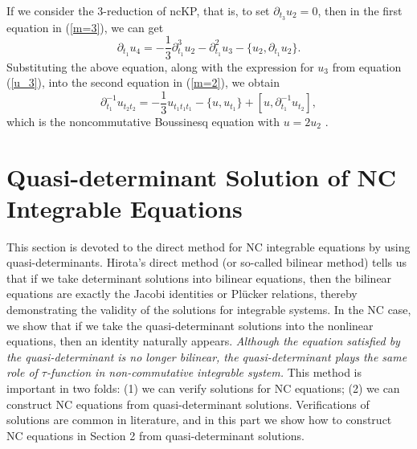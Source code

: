 \documentclass[11p,reqno]{amsart}
\numberwithin{equation}{section}
\numberwithin{equation}{section}
\begin{document}
If we consider the $3$-reduction of ncKP, that is, to set $\partial_{t_3}u_2=0$, then in the first equation in (\ref{m=3}), we can get 
\begin{equation}
    \partial_{t_1} u_4 = - \frac{1}{3} \partial_{t_1}^3 u_2 - \partial_{t_1}^2 u_3 - \{u_2, \partial_{t_1} u_2\}.
\end{equation}
Substituting the above equation, along with the expression for $u_3$ from equation (\ref{u_3}), into the second equation in (\ref{m=2}), we obtain
\begin{equation} \label{ncBoussinesq}
    \partial_{t_1}^{-1} u_{t_2t_2} = - \frac{1}{3} u_{t_1t_1t_1} - \{u, u_{t_1}\} + \left[u, \partial_{t_1}^{-1} u_{t_2}\right],
\end{equation}
which is the noncommutative Boussinesq equation with $u = 2u_2$ \cite{hamanaka05}.

\section{Quasi-determinant Solution of NC Integrable Equations}

This section is devoted to the direct method for NC integrable equations by using quasi-determinants.  Hirota's direct method (or so-called bilinear method) tells us that if we take determinant solutions into bilinear equations, then the bilinear equations are exactly the Jacobi identities or Pl\"ucker relations, thereby demonstrating the validity of the solutions for integrable systems. In the NC case, we show that if we take the quasi-determinant solutions into the nonlinear equations, then an identity naturally appears. \emph{Although the equation satisfied by the quasi-determinant is no longer bilinear, the quasi-determinant plays the same role of $\tau$-function in non-commutative integrable system.} This method is important in two folds: (1) we can verify solutions for NC equations; (2) we can construct NC equations from quasi-determinant solutions. Verifications of solutions are common in literature, and in this part we show how to construct NC equations in Section 2 from quasi-determinant solutions.
\end{document}

